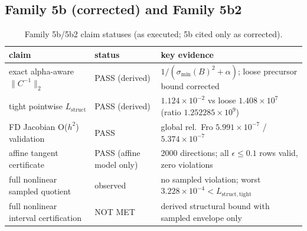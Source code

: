 \documentclass[12pt]{article}
\begin{document}
\subsection{Family 5b (corrected) and Family 5b2}
\begin{table}[ht]
\centering
\small
\caption{Family 5b/5b2 claim statuses (as executed; 5b cited only as
corrected).}
\label{app:tab:f5b2}
\begin{tabular}{p{} p{} p{}}
\toprule
claim & status & key evidence \\
\midrule
exact alpha-aware $\|C^{-1}\|_2$ & PASS (derived) &
$1/(\sigma_{\min}(B)^2+\alpha)$; loose precursor bound corrected \\
tight pointwise $L_{\mathrm{struct}}$ & PASS (derived) &
$1.124\times10^{-2}$ vs loose $1.408\times10^7$
(ratio $1.252285\times10^9$) \\
FD Jacobian O($h^2$) validation & PASS &
global rel.\ Fro $5.991\times10^{-7}$ / $5.374\times10^{-7}$ \\
affine tangent certificate & PASS (affine model only) &
2000 directions; all $\epsilon\le0.1$ rows valid, zero violations \\
full nonlinear sampled quotient & observed &
no sampled violation; worst $3.228\times10^{-4}<L_{\mathrm{struct,tight}}$ \\
full nonlinear interval certification & NOT MET &
derived structural bound with sampled envelope only \\
\bottomrule
\end{tabular}
\end{table}
\end{document}
